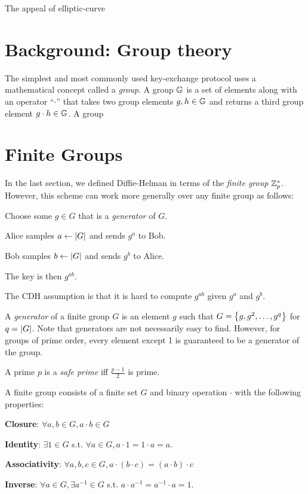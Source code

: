 The appeal of elliptic-curve 


\section{Background: Group theory}
The simplest and most commonly used key-exchange protocol uses
a mathematical concept called a \emph{group}.
A group $\mathbb{G}$ is a set of elements along with an operator
``$\cdot$'' that takes two group elements $g, h \in \mathbb{G}$
and returns a third group element $g \cdot h \in \mathbb{G}$.
A group 


\iffalse
\section{Finite Groups}
In the last section, we defined Diffie-Helman in terms of the \emph{finite group} $\mathbb{Z}_p^*$. However, this scheme can work more generally over any finite group as follows:

\begin{compactenum}
	\item Choose some $g \in G$ that is a \emph{generator} of $G$.
	\item Alice samples $a \gets \left| G \right|$ and sends $g^a$ to Bob.
	\item Bob samples $b \gets \left| G \right|$ and sends $g^b$ to Alice.
	\item The key is then $g^{ab}$.
\end{compactenum}

The CDH assumption is that it is hard to compute $g^{ab}$ given $g^a$ and $g^b$.

\begin{definition}
	A \emph{generator} of a finite group $G$ is an element $g$ such that $G = \left\{ g, g^2, \ldots, g^q \right\}$ for $q = \left| G \right|$. Note that generators are not necessarily easy to find. However, for groups of prime order, every element except 1 is guaranteed to be a generator of the group.
\end{definition}

\begin{definition}
	A prime $p$ is a \emph{safe prime} iff $\tfrac{p-1}{2}$ is prime.
\end{definition}

\begin{definition}
	A finite group consists of a finite set $G$ and binary operation $\cdot$ with the following properties:
	\begin{compactenum}
		\item \textbf{Closure}: $\forall a, b \in G, a \cdot b \in G$
		\item \textbf{Identity}: $\exists 1 \in G$  s.t. $\forall a \in G, a\cdot 1 = 1\cdot a = a$.
		\item \textbf{Associativity}: $\forall a, b, c \in G, a\cdot (b \cdot c) = (a \cdot b) \cdot c$
		\item \textbf{Inverse}: $\forall a \in G, \exists a^{-1} \in G$ s.t. $a\cdot a^{-1} = a^{-1}\cdot a = 1$.
	\end{compactenum}
\end{definition}

